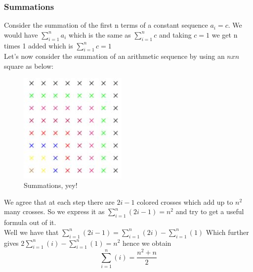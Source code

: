 \documentclass{article}
\theoremstyle{definition}
\numberwithin{equation}{subsection}
\numberwithin{remark}{subsection}
\begin{document}
\subsubsection{Summations}
Consider the summation of the first n terms of a constant sequence $a_{i} = c$. We would have $\sum_{i=1}^{n}a_{i}$ which is the same as $\sum_{i=1}^{n}c$ and taking $c=1$ we get n times 1 added which is $\sum_{i=1}^{n}c = 1$
\\
Let's now consider the summation of an arithmetic sequence by using an $nxn$ square as below: 
\begin{figure}[H]
    \centering
    \includegraphics{epflSemesterOne/advancedComputation/figures/square.JPG}
    \caption{Summations, yey!}
\end{figure}

We agree that at each step there are $2i-1$ colored crosses which add up to $n^2$ many crosses. So we express it as $\sum_{i=1}^{n}(2i-1) = n^2$ and try to get a useful formula out of it. 
\\
Well we have that $\sum_{i=1}^{n}(2i-1) = \sum_{i=1}^{n}(2i) - \sum_{i=1}^{n}(1)$ Which further gives $2\sum_{i=1}^{n}(i) - \sum_{i=1}^{n}(1) = n^2$ hence we obtain $$\sum_{i=1}^{n}(i) = \frac{n^2 + n}{2}$$
\end{document}
